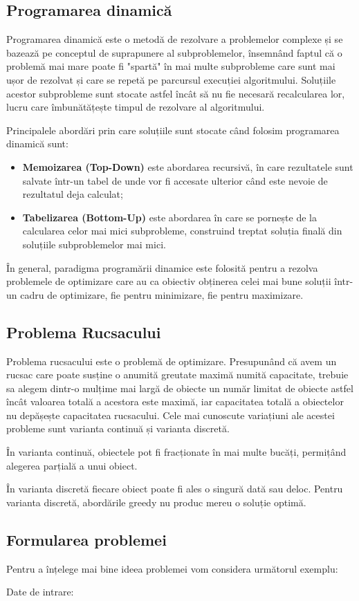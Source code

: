 \subsection*{Programarea dinamică}
Programarea dinamică este o metodă de rezolvare a problemelor complexe și se bazează pe conceptul de suprapunere al subproblemelor, însemnând faptul că o problemă mai mare poate fi "spartă" în mai multe subprobleme care sunt mai ușor de rezolvat și care se repetă pe parcursul execuției algoritmului. 
Soluțiile acestor subprobleme sunt stocate astfel încât să nu fie necesară recalcularea lor, lucru care îmbunătățește timpul de rezolvare al  algoritmului. \par 
Principalele abordări prin care soluțiile sunt stocate când folosim programarea dinamică sunt:
\begin{itemize}
     \item \textbf{Memoizarea (Top-Down)} este abordarea recursivă, în care rezultatele sunt salvate într-un tabel de unde vor fi accesate ulterior când este nevoie de rezultatul deja calculat;
     \item \textbf{Tabelizarea (Bottom-Up)} este abordarea în care se pornește de la calcularea celor mai mici subprobleme, construind treptat soluția finală din soluțiile subproblemelor mai mici.
\end{itemize}
În general, paradigma programării dinamice este folosită pentru a rezolva problemele de optimizare care au ca obiectiv obținerea celei mai bune soluții într-un cadru de optimizare, fie pentru minimizare, fie pentru maximizare.\par


\subsection*{Problema Rucsacului}
Problema rucsacului este o problemă de optimizare. Presupunând că avem un rucsac care poate susține o anumită greutate maximă numită capacitate, trebuie sa alegem dintr-o mulțime mai largă de obiecte un număr limitat de obiecte astfel încât valoarea totală a acestora este maximă, iar capacitatea totală a obiectelor nu depășește capacitatea rucsacului. Cele mai cunoscute variațiuni ale acestei probleme sunt varianta continuă și varianta discretă. \par 
În varianta continuă, obiectele pot fi fracționate în mai multe bucăți, permițând alegerea parțială a unui obiect. \par
În varianta discretă fiecare obiect poate fi ales o singură dată sau deloc. Pentru varianta discretă, abordările greedy nu produc mereu o soluție optimă.

\subsection*{Formularea problemei}
Pentru a înțelege mai bine ideea problemei vom considera următorul exemplu:
\begin{textbox}
Date de intrare: 

\end{textbox}
